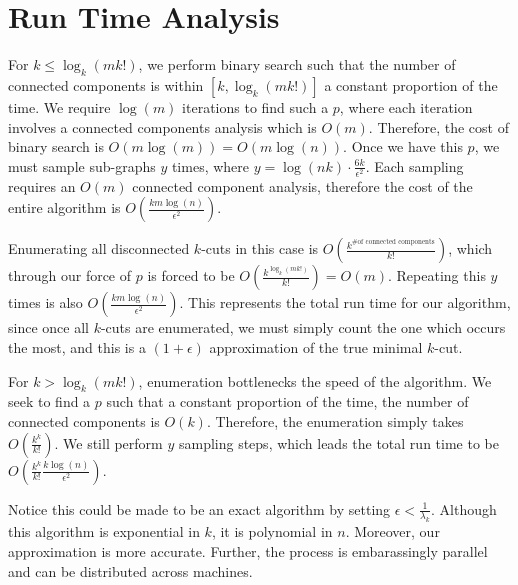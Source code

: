 \documentclass[12pt]{article}
\begin{document}
\section{Run Time Analysis}

For $k \leq \log_k(mk!)$, we perform binary search such that the number of connected components is within $[k, \log_k(mk!)]$ a constant proportion of the time. We require $\log(m)$ iterations to find such a $p$, where each iteration involves a connected components analysis which is $O(m)$. Therefore, the cost of binary search is $O(m \log(m)) = O(m \log(n))$. Once we have this $p$, we must sample sub-graphs $y$ times, where $y = \log(nk) \cdot \frac{6k}{\epsilon^2}$. Each sampling requires an $O(m)$ connected component analysis, therefore the cost of the entire algorithm is $O(\frac{km \log(n)}{\epsilon^2})$.

Enumerating all disconnected $k$-cuts in this case is $O(\frac{k^{\text{\# of connected components}}}{k!})$, which through our force of $p$ is forced to be $O(\frac{k^{\log_k(mk!)}}{k!}) = O(m)$. Repeating this $y$ times is also $O(\frac{km \log(n)}{\epsilon^2})$. This represents the total run time for our algorithm, since once all $k$-cuts are enumerated, we must simply count the one which occurs the most, and this is a $(1+\epsilon)$ approximation of the true minimal $k$-cut.

For $k > \log_k(mk!)$, enumeration bottlenecks the speed of the algorithm. We seek to find a $p$ such that a constant proportion of the time, the number of connected components is $O(k)$. Therefore, the enumeration simply takes $O(\frac{k^k}{k!})$. We still perform $y$ sampling steps, which leads the total run time to be $O(\frac{k^k}{k!} \frac{k \log(n)}{\epsilon^2})$.

Notice this could be made to be an exact algorithm by setting $\epsilon < \frac{1}{\lambda_k}$. Although this algorithm is exponential in $k$, it is polynomial in $n$. Moreover, our approximation is more accurate. Further, the process is embarassingly parallel and can be distributed across machines.
\end{document}
